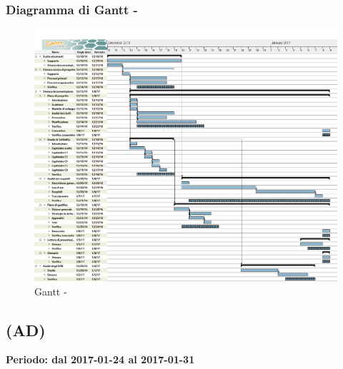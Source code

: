 \documentclass[./PianoDiProgetto.tex]{subfiles}
\begin{document}
  \subsubsection{Diagramma di Gantt - \PerAR}
    \begin{figure}[!h]
    \centering
    \includegraphics[width=\textwidth]{images/AR}
    \caption{Gantt - \PerAR}
    \end{figure}
    
	\subsection{\PerAD{} (AD)}
  \textbf{Periodo: dal 2017-01-24 al 2017-01-31}
\end{document}
